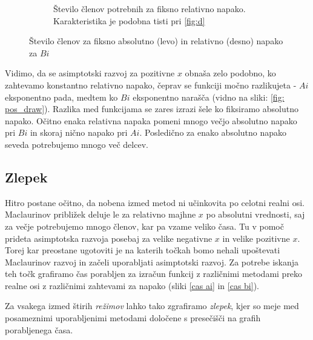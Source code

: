 \documentclass[slovene,11pt,a4paper]{article}
\begin{document}
\begin{figure}[ht]
\begin{subfigure}{0.48\textwidth}
    \caption{Število členov potrebnih za fiksno relativno napako. Karakteristika je podobna tisti pri \ref{fig:d}}
  \end{subfigure}

  \caption{Število členov za fiksno absolutno (levo) in relativno (desno) napako za $Bi$}
  \label{fig:fourplots}
\end{figure}

Vidimo, da se asimptotski razvoj za pozitivne $x$ obnaša zelo podobno, ko zahtevamo konstantno relativno napako, čeprav se funkciji močno razlikujeta - $Ai$ eksponentno pada, medtem ko $Bi$ eksponentno narašča (vidno na sliki: \ref{fig: pos_draw}). Razlika med funkcijama se zares izrazi šele ko fiksiramo absolutno napako. Očitno enaka relativna napaka pomeni mnogo večjo absolutno napako pri $Bi$ in skoraj nično napako pri $Ai$. Posledično za enako absolutno napako seveda potrebujemo mnogo več delcev.

\newpage
\subsection{Zlepek}

Hitro postane očitno, da nobena izmed metod ni učinkovita po celotni realni osi. Maclaurinov približek deluje le za relativno majhne $x$ po absolutni vrednosti, saj za večje potrebujemo mnogo členov, kar pa vzame veliko časa. Tu v pomoč prideta asimptotska razvoja posebaj za velike negativne $x$ in velike pozitivne $x$. Torej kar preostane ugotoviti je na katerih točkah bomo nehali upoštevati Maclaurinov razvoj in začeli uporabljati asimptotski razvoj. Za potrebe iskanja teh točk grafiramo čas porabljen za izračun funkcij z različnimi metodami preko realne osi z različnimi zahtevami za napako (sliki \ref{cas ai} in \ref{cas bi}). 

Za vsakega izmed štirih \textit{režimov} lahko tako zgrafiramo \textit{zlepek}, kjer so meje med posameznimi uporabljenimi metodami določene s presečišči na grafih porabljenega časa.
\end{document}
